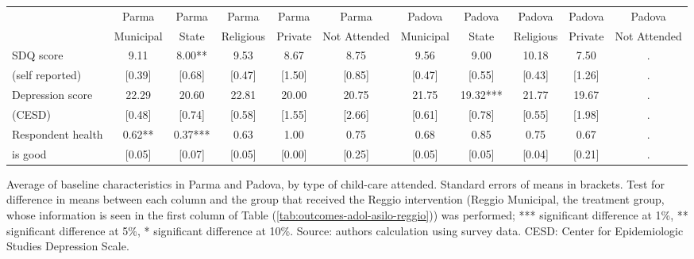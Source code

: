 
\centering
\begin{adjustbox}{width=1\textwidth,center=\textwidth}
\small
\begin{tabular}{m{4.0cm} cccccccccc}
\hline \hline 
 & Parma & Parma & Parma & Parma & Parma & Padova & Padova & Padova & Padova & Padova \\
 & Municipal & State & Religious & Private & Not Attended & Municipal & State & Religious & Private & Not Attended \\
\hline 
SDQ score  & 9.11 & 8.00** & 9.53 & 8.67 & 8.75 & 9.56 & 9.00 & 10.18 & 7.50 & . \\
(self reported)  & [0.39] & [0.68] & [0.47] & [1.50] & [0.85] & [0.47] & [0.55] & [0.43] & [1.26] & . \\
Depression score  & 22.29 & 20.60 & 22.81 & 20.00 & 20.75 & 21.75 & 19.32*** & 21.77 & 19.67 & . \\
(CESD)  & [0.48] & [0.74] & [0.58] & [1.55] & [2.66] & [0.61] & [0.78] & [0.55] & [1.98] & . \\
Respondent health  & 0.62** & 0.37*** & 0.63 & 1.00 & 0.75 & 0.68 & 0.85 & 0.75 & 0.67 & . \\
is good  & [0.05] & [0.07] & [0.05] & [0.00] & [0.25] & [0.05] & [0.05] & [0.04] & [0.21] & . \\
\hline
\end{tabular}

\end{adjustbox}
\raggedright{
\footnotesize{Average of baseline characteristics in Parma and Padova, by type of child-care attended. Standard errors of means in brackets. Test for difference in means between each column and the group that received the Reggio intervention (Reggio Municipal, the treatment group, whose information is seen in the first column of Table (\ref{tab:outcomes-adol-asilo-reggio})) was performed; *** significant difference at 1\%, ** significant difference at 5\%, * significant difference at 10\%. Source: authors calculation using survey data. CESD: Center for Epidemiologic Studies Depression Scale.}
}

